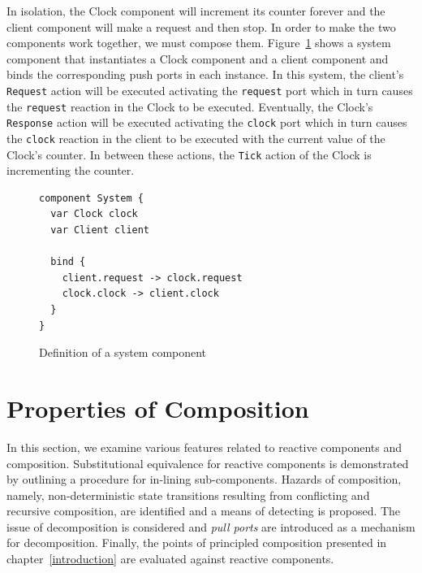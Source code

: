 In isolation, the Clock component will increment its counter forever and the client component will make a request and then stop.
In order to make the two components work together, we must compose them.
Figure~\ref{system_component} shows a system component that instantiates a Clock component and a client component and binds the corresponding push ports in each instance.
In this system, the client's \verb+Request+ action will be executed activating the \verb+request+ port which in turn causes the \verb+request+ reaction in the Clock to be executed.
Eventually, the Clock's \verb+Response+ action will be executed activating the \verb+clock+ port which in turn causes the \verb+clock+ reaction in the client to be executed with the current value of the Clock's counter.
In between these actions, the \verb+Tick+ action of the Clock is incrementing the counter.

\begin{figure}
\begin{verbatim}
component System {
  var Clock clock
  var Client client

  bind {
    client.request -> clock.request
    clock.clock -> client.clock
  }
}
\end{verbatim}
\caption{Definition of a system component\label{system_component}}
\end{figure}

\section{Properties of Composition}
In this section, we examine various features related to reactive components and composition.
Substitutional equivalence for reactive components is demonstrated by outlining a procedure for in-lining sub-components.
Hazards of composition, namely, non-deterministic state transitions resulting from conflicting and recursive composition, are identified and a means of detecting is proposed.
The issue of decomposition is considered and \emph{pull ports} are introduced as a mechanism for decomposition.
Finally, the points of principled composition presented in chapter~\ref{introduction} are evaluated against reactive components.

